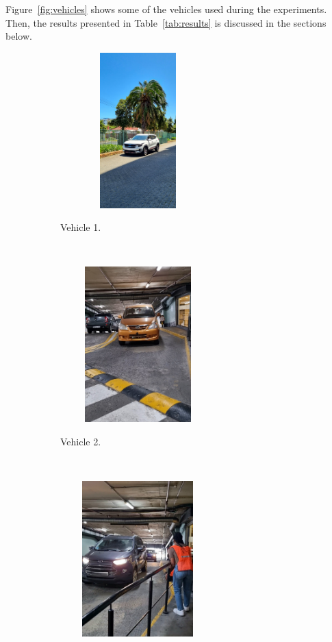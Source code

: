 \documentclass[class=report,11pt,crop=false]{standalone}
\begin{document}
Figure~\ref{fig:vehicles} shows some of the vehicles used during the experiments. Then, the results presented in Table~\ref{tab:results} is discussed in the sections below.
\begin{figure}[htbp]
    \centering
    \captionsetup{type=figure}
    \begin{subfigure}[t]{0.4\textwidth}
        \centering
        \def\svgwidth{1\linewidth}
        {\scriptsize
            \includegraphics[width=6cm,height=6cm]{../Images/vehicles/1.jpg}}
        \caption{Vehicle 1.}
    \end{subfigure}
    ~ 
        \begin{subfigure}[t]{0.4\textwidth}
        \centering
        \def\svgwidth{1\linewidth}
        {\scriptsize
            \includegraphics[width=6cm,height=6cm]{../Images/vehicles/2.jpg}}
        \caption{Vehicle 2.}
    \end{subfigure}
    ~     \begin{subfigure}[t]{0.4\textwidth}
        \centering
        \def\svgwidth{1\linewidth}
        {\scriptsize
            \includegraphics[width=6cm,height=6cm]{../Images/vehicles/3.jpg}}

\end{subfigure}
\end{figure}
\end{document}

